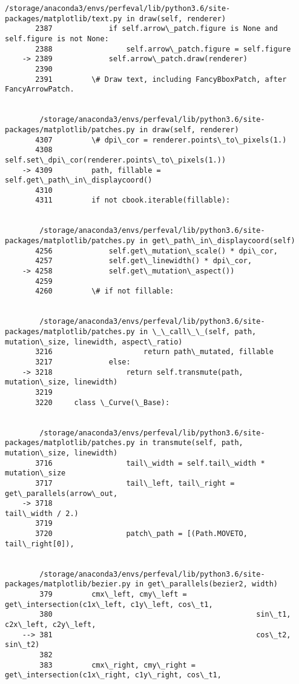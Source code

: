 \documentclass[11pt]{article}
\begin{document}
\begin{Verbatim}[commandchars=\\\{\}]
        /storage/anaconda3/envs/perfeval/lib/python3.6/site-packages/matplotlib/text.py in draw(self, renderer)
       2387             if self.arrow\_patch.figure is None and self.figure is not None:
       2388                 self.arrow\_patch.figure = self.figure
    -> 2389             self.arrow\_patch.draw(renderer)
       2390 
       2391         \# Draw text, including FancyBboxPatch, after FancyArrowPatch.


        /storage/anaconda3/envs/perfeval/lib/python3.6/site-packages/matplotlib/patches.py in draw(self, renderer)
       4307         \# dpi\_cor = renderer.points\_to\_pixels(1.)
       4308         self.set\_dpi\_cor(renderer.points\_to\_pixels(1.))
    -> 4309         path, fillable = self.get\_path\_in\_displaycoord()
       4310 
       4311         if not cbook.iterable(fillable):


        /storage/anaconda3/envs/perfeval/lib/python3.6/site-packages/matplotlib/patches.py in get\_path\_in\_displaycoord(self)
       4256             self.get\_mutation\_scale() * dpi\_cor,
       4257             self.get\_linewidth() * dpi\_cor,
    -> 4258             self.get\_mutation\_aspect())
       4259 
       4260         \# if not fillable:


        /storage/anaconda3/envs/perfeval/lib/python3.6/site-packages/matplotlib/patches.py in \_\_call\_\_(self, path, mutation\_size, linewidth, aspect\_ratio)
       3216                     return path\_mutated, fillable
       3217             else:
    -> 3218                 return self.transmute(path, mutation\_size, linewidth)
       3219 
       3220     class \_Curve(\_Base):


        /storage/anaconda3/envs/perfeval/lib/python3.6/site-packages/matplotlib/patches.py in transmute(self, path, mutation\_size, linewidth)
       3716                 tail\_width = self.tail\_width * mutation\_size
       3717                 tail\_left, tail\_right = get\_parallels(arrow\_out,
    -> 3718                                                       tail\_width / 2.)
       3719 
       3720                 patch\_path = [(Path.MOVETO, tail\_right[0]),


        /storage/anaconda3/envs/perfeval/lib/python3.6/site-packages/matplotlib/bezier.py in get\_parallels(bezier2, width)
        379         cmx\_left, cmy\_left = get\_intersection(c1x\_left, c1y\_left, cos\_t1,
        380                                               sin\_t1, c2x\_left, c2y\_left,
    --> 381                                               cos\_t2, sin\_t2)
        382 
        383         cmx\_right, cmy\_right = get\_intersection(c1x\_right, c1y\_right, cos\_t1,



\end{Verbatim}
\end{document}
